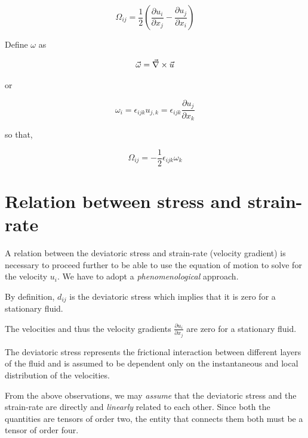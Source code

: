 \begin{equation}
\Omega_{ij} = \frac{1}{2} \left( \frac{\partial u_i}{\partial x_j} - \frac{\partial u_j}{\partial x_i} \right) 
\end{equation} 

Define $\omega$ as 

\begin{equation}
\vec{\omega} = \vec{\nabla} \times \vec{u} 
\end{equation} 

or

\begin{equation}
\omega_i = \epsilon_{ijk}u_{j,k} = \epsilon_{ijk} \frac{\partial u_j}{\partial x_k} 
\end{equation} 

so that,

\begin{equation}
\Omega_{ij} = -\frac{1}{2}\epsilon_{ijk}\omega_k
\end{equation} 


\section{Relation between stress and strain-rate}

A relation between the deviatoric stress and strain-rate (velocity gradient) is necessary to proceed further to be able to use the equation of motion to solve for the velocity $u_i$. We have to adopt a {\em phenomenological} approach. 

\begin{list}{}{}
\item By definition, $d_{ij}$ is the deviatoric stress which implies that it is zero for a stationary fluid.
\item The velocities and thus the velocity gradients $\frac{\partial u_i}{\partial x_j}$ are zero for a stationary fluid.
\item The deviatoric stress represents the frictional interaction between different layers of the fluid and is assumed to be dependent only on the instantaneous and local distribution of the velocities. 
\end{list} 

From the above observations, we may {\em assume} that the deviatoric stress and the strain-rate are directly and {\em linearly} related to each other. Since both the quantities are tensors of order two, the entity that connects them both must be a tensor of order four.

